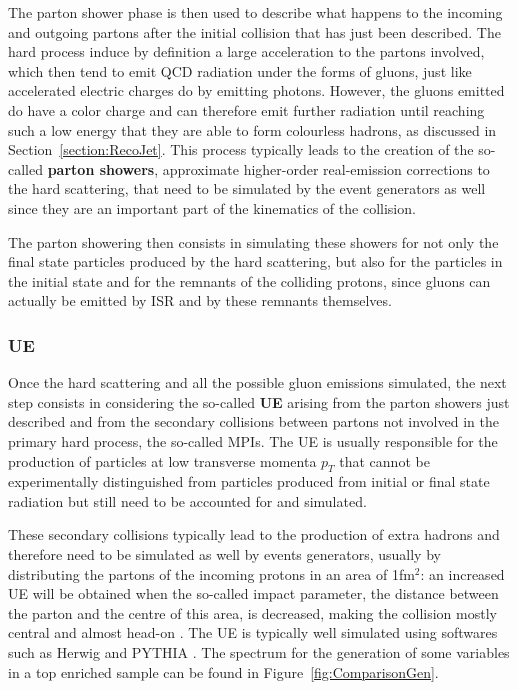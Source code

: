 \documentclass[a4paper, 10pt, openright]{report}
\begin{document}
The parton shower phase is then used to describe what happens to the incoming and outgoing partons after the initial collision that has just been described. The hard process induce by definition a large acceleration to the partons involved, which then tend to emit \ac{QCD} radiation under the forms of gluons, just like accelerated electric charges do by emitting photons. However, the gluons emitted do have a color charge and can therefore emit further radiation until reaching such a low energy that they are able to form colourless hadrons, as discussed in Section~\ref{section:RecoJet}. This process typically leads to the creation of the so-called \textbf{parton showers}, approximate higher-order real-emission corrections to the hard scattering, that need to be simulated by the event generators as well since they are an important part of the kinematics of the collision.

The parton showering then consists in simulating these showers for not only the final state particles produced by the hard scattering, but also for the particles in the initial state and for the remnants of the colliding protons, since gluons can actually be emitted by \acf{ISR} and by these remnants themselves.

\subsubsection*{\acf{UE}}

Once the hard scattering and all the possible gluon emissions simulated, the next step consists in considering the so-called \textbf{\acf{UE}} arising from the parton showers just described and from the secondary collisions between partons not involved in the primary hard process, the so-called \acp{MPI}. The \ac{UE} is usually responsible for the production of particles at low transverse momenta $p_T$ that cannot be experimentally distinguished from particles produced from initial or final state radiation but still need to be accounted for and simulated.

These secondary collisions typically lead to the production of extra hadrons and therefore need to be simulated as well by events generators, usually by distributing the partons of the incoming protons in an area of 1fm$^2$: an increased \ac{UE} will be obtained when the so-called impact parameter, the distance between the parton and the centre of this area, is decreased, making the collision mostly central and almost head-on \cite{UE}. The \ac{UE} is typically well simulated using softwares such as Herwig \cite{Herwig} and PYTHIA \cite{PYTHIA}. The spectrum for the generation of some variables in a top enriched sample can be found in Figure~\ref{fig:ComparisonGen}.
\end{document}
